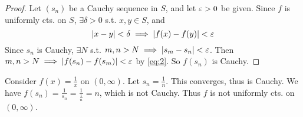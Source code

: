 \documentclass{article}
\begin{document}
\begin{proof}
Let $(s_n)$ be a Cauchy sequence in $S$, and let $\varepsilon > 0$ be given.
Since $f$ is uniformly cts. on $S$, $\exists \delta > 0$ s.t. $x, y \in S$, and \begin{equation} \label{eq:2}
    |x-y| < \delta \implies |f(x) - f(y)| < \varepsilon
\end{equation}
Since $s_n$ is Cauchy, $\exists N$ s.t. $m, n > N \implies |s_m - s_n| < \varepsilon$. Then $m, n > N \implies |f(s_n) - f(s_m)| < \varepsilon$ by \eqref{eq:2}. So $f(s_n)$ is Cauchy.
\end{proof}
\begin{example}
Consider $f(x) = \frac{1}{x}$ on $(0, \infty)$.
Let $s_n = \frac{1}{n}$. This converges, thus is Cauchy. We have $f(s_n) = \frac{1}{s_n} = \frac{1}{\frac{1}{n}} = n$, which is not Cauchy. Thus $f$ is not uniformly cts. on $(0, \infty)$.
\end{example}
\end{document}
